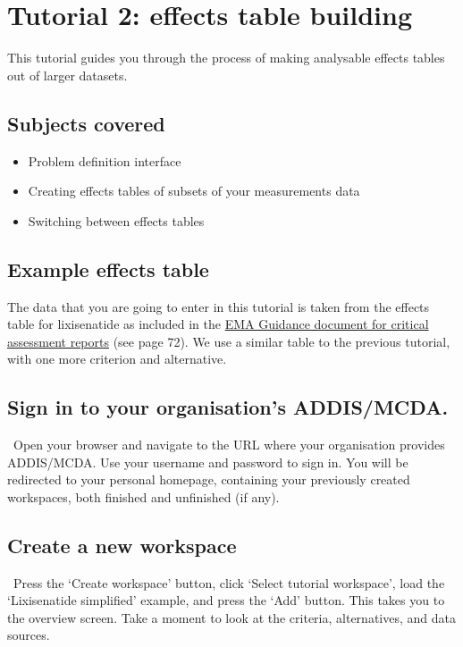 \documentclass[00_mcda_tutorial.tex]{subfiles}
\begin{document}
\section*{Tutorial 2: effects table building}
\addtocounter{section}{1}

This tutorial guides you through the process of making analysable effects tables out of larger datasets.

\subsection*{Subjects covered}
\begin{itemize}
    \item Problem definition interface
    \item Creating effects tables of subsets of your measurements data
    \item Switching between effects tables
\end{itemize}

\subsection*{Example effects table}
The data that you are going to enter in this tutorial is taken from the effects table for lixisenatide as included in the \href{https://www.ema.europa.eu/documents/template-form/day-80-assessment-report-overview-d120-loq-template-guidance-rev-1019_en.docx}{EMA Guidance document for critical assessment reports} (see page 72). We use a similar table to the previous tutorial, with one more criterion and alternative.


\subsection*{Sign in to your organisation's ADDIS/MCDA.}
\leftpointright \, Open your browser and navigate to the URL where your organisation provides ADDIS/MCDA.
Use your username and password to sign in.
You will be redirected to your personal homepage, containing your previously created workspaces, both finished and unfinished (if any).

\subsection*{Create a new workspace}
\leftpointright \, Press the ‘Create workspace’ button, click ‘Select tutorial workspace’, load the ‘Lixisenatide simplified’ example, and press the ‘Add’ button. This takes you to the overview screen. Take a moment to look at the criteria, alternatives, and data sources.
\end{document}
